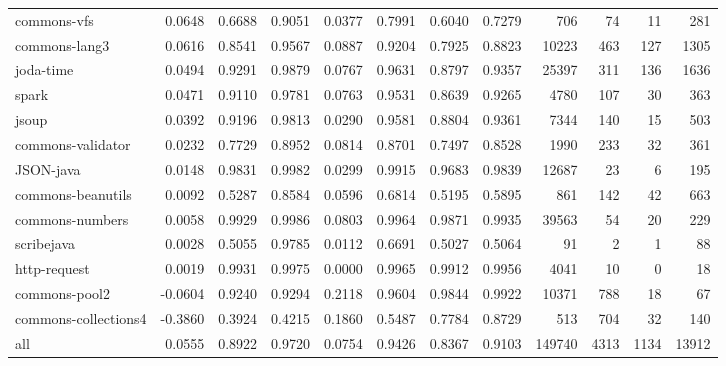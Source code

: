 \begin{table}
\begin{tabular}{lrrrrrrrrrrr}
            commons-vfs &      0.0648 &  0.6688 &     0.9051 &     0.0377 &  0.7991 &     0.6040 &   0.7279 &     706 &    74 &    11 &    281 \\
          commons-lang3 &      0.0616 &  0.8541 &     0.9567 &     0.0887 &  0.9204 &     0.7925 &   0.8823 &   10223 &   463 &   127 &   1305 \\
              joda-time &      0.0494 &  0.9291 &     0.9879 &     0.0767 &  0.9631 &     0.8797 &   0.9357 &   25397 &   311 &   136 &   1636 \\
                  spark &      0.0471 &  0.9110 &     0.9781 &     0.0763 &  0.9531 &     0.8639 &   0.9265 &    4780 &   107 &    30 &    363 \\
                  jsoup &      0.0392 &  0.9196 &     0.9813 &     0.0290 &  0.9581 &     0.8804 &   0.9361 &    7344 &   140 &    15 &    503 \\
      commons-validator &      0.0232 &  0.7729 &     0.8952 &     0.0814 &  0.8701 &     0.7497 &   0.8528 &    1990 &   233 &    32 &    361 \\
              JSON-java &      0.0148 &  0.9831 &     0.9982 &     0.0299 &  0.9915 &     0.9683 &   0.9839 &   12687 &    23 &     6 &    195 \\
      commons-beanutils &      0.0092 &  0.5287 &     0.8584 &     0.0596 &  0.6814 &     0.5195 &   0.5895 &     861 &   142 &    42 &    663 \\
        commons-numbers &      0.0058 &  0.9929 &     0.9986 &     0.0803 &  0.9964 &     0.9871 &   0.9935 &   39563 &    54 &    20 &    229 \\
             scribejava &      0.0028 &  0.5055 &     0.9785 &     0.0112 &  0.6691 &     0.5027 &   0.5064 &      91 &     2 &     1 &     88 \\
           http-request &      0.0019 &  0.9931 &     0.9975 &     0.0000 &  0.9965 &     0.9912 &   0.9956 &    4041 &    10 &     0 &     18 \\
          commons-pool2 &     -0.0604 &  0.9240 &     0.9294 &     0.2118 &  0.9604 &     0.9844 &   0.9922 &   10371 &   788 &    18 &     67 \\
   commons-collections4 &     -0.3860 &  0.3924 &     0.4215 &     0.1860 &  0.5487 &     0.7784 &   0.8729 &     513 &   704 &    32 &    140 \\
                    all &      0.0555 &  0.8922 &     0.9720 &     0.0754 &  0.9426 &     0.8367 &   0.9103 &  149740 &  4313 &  1134 &  13912 \\
\bottomrule
\end{tabular}
\end{table}
